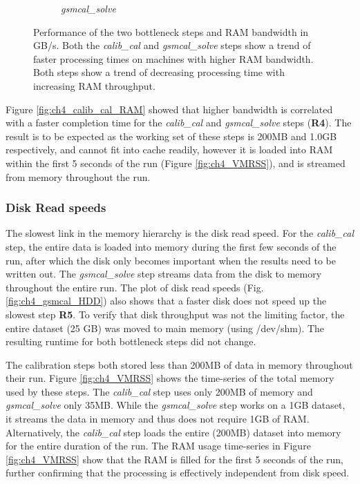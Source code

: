 \begin{figure}
\begin{subfigure}{0.45\textwidth}
      \caption{\textit{gsmcal\_solve}}
	\label{fig:ch4_gamcal_RAM}
 \end{subfigure}
 \label{fig:ch4_ram_bandw}
    \caption[Effect of RAM throughput on the bottle neck steps for the four test machines.]{Performance of the two bottleneck steps and RAM bandwidth in GB/s. Both the \textit{calib\_cal} and \textit{gsmcal\_solve} steps show a trend of faster processing times on machines with higher RAM bandwidth. Both steps show a trend of decreasing processing time with increasing RAM throughput.} 
\end{figure}

Figure \ref{fig:ch4_calib_cal_RAM} showed that higher bandwidth is correlated with a faster completion time for the \textit{calib\_cal} and \textit{gsmcal\_solve} steps (\textbf{R4}). The result is to be expected as the working set of these steps is 200MB and 1.0GB respectively, and cannot fit into cache readily, however it is loaded into RAM within the first 5 seconds of the run (Figure \ref{fig:ch4_VMRSS}), and is streamed from memory throughout the run. 

\subsubsection{Disk Read speeds}

The slowest link in the memory hierarchy is the disk read speed. For the \textit{calib\_cal} step, the entire data is loaded into memory during the first few seconds of the run, after which the disk only becomes important when the results need to be written out. The \textit{gsmcal\_solve} step streams data from the disk to memory throughout the entire run.  The plot of disk read speeds (Fig. \ref{fig:ch4_gsmcal_HDD}) also shows that a faster disk does not speed up the slowest step \textbf{R5}. To verify that disk throughput was not the limiting factor, the entire dataset (25 GB) was moved to main memory (using /dev/shm).  The resulting runtime for both bottleneck steps did not change.  

The calibration steps both stored less than 200MB of data in memory throughout their run. Figure \ref{fig:ch4_VMRSS} shows the time-series of the total memory used by these steps. The \textit{calib\_cal} step uses only 200MB of memory and \textit{gsmcal\_solve} only 35MB. While the \textit{gsmcal\_solve} step works on a 1GB dataset, it streams the data in memory and thus does not require 1GB of RAM. Alternatively, the \textit{calib\_cal} step loads the entire (200MB) dataset into memory for the entire duration of the run. The RAM usage time-series in Figure \ref{fig:ch4_VMRSS} show that the RAM is filled for the first 5 seconds of the run, further confirming that the processing is effectively independent from disk speed. 


